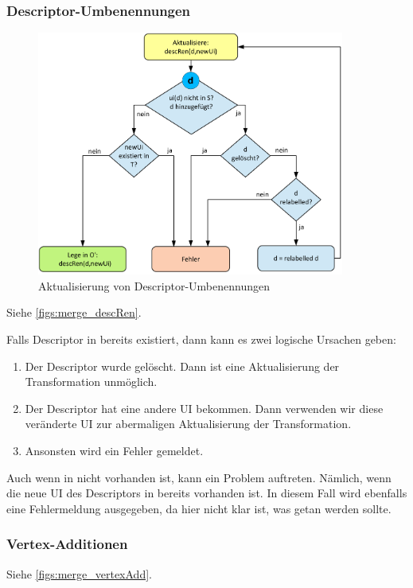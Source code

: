\subsubsection{Descriptor-Umbenennungen}

\begin{figure}
\begin{center}
\includegraphics[width=0.9\textwidth]{figs/merge_descRen.pdf}
\end{center}
\caption{Aktualisierung von Descriptor-Umbenennungen}
\label{figs:merge_descRen}
\end{figure}
Siehe \autoref{figs:merge_descRen}.\par

Falls Descriptor  in  bereits existiert, dann kann es zwei logische Ursachen geben:
\begin{enumerate}
  \item Der Descriptor wurde gelöscht. Dann ist eine Aktualisierung der Transformation unmöglich. 
  \item Der Descriptor hat eine andere UI bekommen. Dann verwenden wir diese veränderte UI zur abermaligen Aktualisierung der Transformation.
  \item[] Ansonsten wird ein Fehler gemeldet.
\end{enumerate}

Auch wenn  in  nicht vorhanden ist, kann ein Problem auftreten. Nämlich, wenn die neue UI des Descriptors in  bereits vorhanden ist. In diesem Fall wird ebenfalls eine Fehlermeldung ausgegeben, da hier nicht klar ist, was getan werden sollte. 

\subsubsection{Vertex-Additionen}
Siehe \autoref{figs:merge_vertexAdd}.\par

